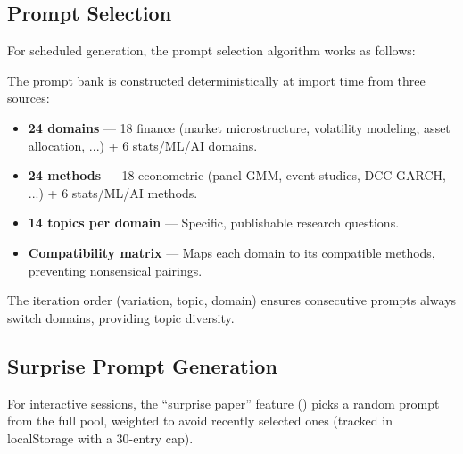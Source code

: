 \subsection{Prompt Selection}

For scheduled generation, the prompt selection algorithm works as follows:

\begin{algorithm}[H]
\caption{Prompt Selection in the Auto-Paper Scheduler}
\label{alg:prompt-selection}
\SetAlgoLined
{}


\;
\end{algorithm}

The prompt bank is constructed deterministically at import time from three sources:
\begin{itemize}
  \item \textbf{24 domains} --- 18 finance (market microstructure, volatility modeling, asset allocation, ...) + 6 stats/ML/AI domains.
  \item \textbf{24 methods} --- 18 econometric (panel GMM, event studies, DCC-GARCH, ...) + 6 stats/ML/AI methods.
  \item \textbf{14 topics per domain} --- Specific, publishable research questions.
  \item \textbf{Compatibility matrix} --- Maps each domain to its compatible methods, preventing nonsensical pairings.
\end{itemize}

The iteration order (variation, topic, domain) ensures consecutive prompts always switch domains, providing topic diversity.

\subsection{Surprise Prompt Generation}

For interactive sessions, the ``surprise paper'' feature () picks a random prompt from the full pool, weighted to avoid recently selected ones (tracked in localStorage with a 30-entry cap).

